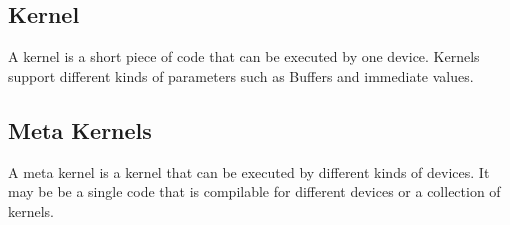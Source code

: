 \subsection{Kernel}
A kernel is a short piece of code that can be executed by one device.
Kernels support different kinds of parameters such as Buffers and immediate values.

\subsection{Meta Kernels}
A meta kernel is a kernel that can be executed by different kinds of devices.
It may be be a single code that is compilable for different devices or a collection of kernels.

